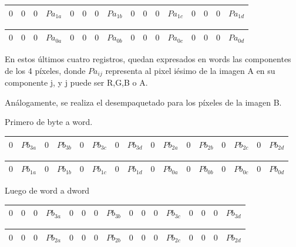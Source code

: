 \begin{enumerate}
\begin{tabular}{| o | o | o | o | o | o | o | o | o | o | o | o | o | o | o | o |} %
\hline
$0$ & $0$ & $0$ & $Pa_{1a}$ & $0$ & $0$ & $0$ & $Pa_{1b}$ & $0$ & $0$ & $0$ & $Pa_{1c}$ & $0$ & $0$ & $0$ & $Pa_{1d}$\\ 
\hline
\end{tabular}

\begin{tabular}{| o | o | o | o | o | o | o | o | o | o | o | o | o | o | o | o |} %
\hline
$0$ & $0$ & $0$ & $Pa_{0a}$ & $0$ & $0$ & $0$ & $Pa_{0b}$ & $0$ & $0$ & $0$ & $Pa_{0c}$ & $0$ & $0$ & $0$ & $Pa_{0d}$ \\ 
\hline
\end{tabular}

En estos últimos cuatro registros, quedan expresados en words las componentes de los 4 píxeles, donde $Pa_{ij}$ representa al pixel iésimo de la imagen A en su componente j, y j puede ser R,G,B o A.

Análogamente, se realiza el desempaquetado para los píxeles de la imagen B. 

Primero de byte a word.

\begin{tabular}{| g | g | g | g | g | g | g | g | g | g | g | g | g | g | g | g |} %
\hline
$0$ & $Pb_{3a}$ & $0$ & $Pb_{3b}$ & $0$ & $Pb_{3c}$ & $0$ & $Pb_{3d}$ & $0$ & $Pb_{2a}$ & $0$ & $Pb_{2b}$ & $0$ & $Pb_{2c}$ & $0$ & $Pb_{2d}$ \\ 
\hline
\end{tabular}


\begin{tabular}{| g | g | g | g | g | g | g | g | g | g | g | g | g | g | g | g |}
\hline
$0$ & $Pb_{1a}$ & $0$ & $Pb_{1b}$ & $0$ & $Pb_{1c}$ & $0$ & $Pb_{1d}$ & $0$ & $Pb_{0a}$ & $0$ & $Pb_{0b}$ & $0$ & $Pb_{0c}$ & $0$ & $Pb_{0d}$ \\ 
\hline
\end{tabular}

Luego de word a dword

\begin{tabular}{| g | g | g | g | g | g | g | g | g | g | g | g | g | g | g | g |}
\hline
$0$ & $0$ & $0$ & $Pb_{3a}$ & $0$ & $0$ & $0$ & $Pb_{3b}$ & $0$ & $0$ & $0$ & $Pb_{3c}$ & $0$ & $0$ & $0$ & $Pb_{3d}$ \\ 
\hline
\end{tabular}

\begin{tabular}{| g | g | g | g | g | g | g | g | g | g | g | g | g | g | g | g |}
\hline
$0$ & $0$ & $0$ & $Pb_{2a}$ & $0$ & $0$ & $0$ & $Pb_{2b}$ & $0$ & $0$ & $0$ & $Pb_{2c}$ & $0$ & $0$ & $0$ & $Pb_{2d}$ \\ 
\hline
\end{tabular}


\end{enumerate}

